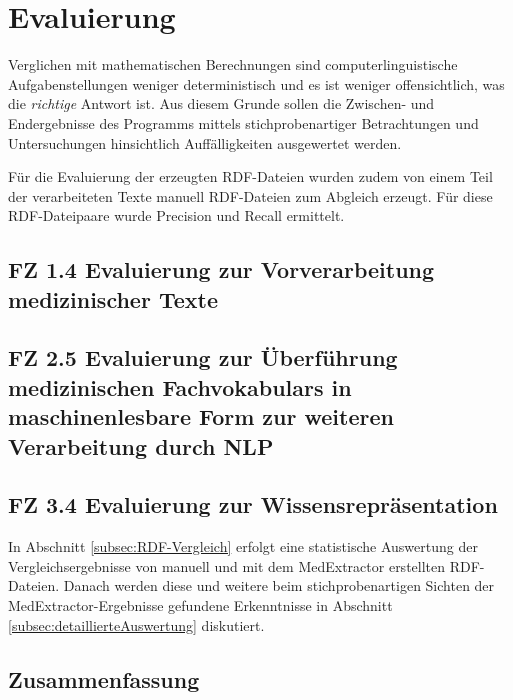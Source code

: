 \chapter{Evaluierung}
\label{ch:evaluierung}

Verglichen mit mathematischen Berechnungen sind computerlinguistische Aufgabenstellungen weniger deterministisch und es ist weniger offensichtlich, was die \emph{richtige} Antwort ist.  Aus diesem Grunde sollen die Zwischen- und Endergebnisse des Programms mittels stichprobenartiger Betrachtungen und Untersuchungen hinsichtlich Auffälligkeiten ausgewertet werden. 

Für die Evaluierung der erzeugten RDF-Dateien wurden zudem von einem Teil der verarbeiteten Texte manuell RDF-Dateien zum Abgleich erzeugt. Für diese RDF-Dateipaare wurde Precision und Recall ermittelt.


\section{FZ 1.4 Evaluierung zur Vorverarbeitung medizinischer Texte}
\label{sec:FZ1.4} 





\section[FZ 2.5 Evaluierung zur Überführung med. Fachvokabulars]{FZ 2.5 Evaluierung zur Überführung medizinischen Fachvokabulars in maschinenlesbare Form zur weiteren Verarbeitung durch NLP}
\label{sec:FZ2.5}



\section{FZ 3.4 Evaluierung zur Wissensrepräsentation}
\label{sec:FZ3.4} 
In Abschnitt \ref{subsec:RDF-Vergleich} erfolgt eine statistische Auswertung der Vergleichsergebnisse von manuell und mit dem MedExtractor erstellten RDF-Dateien. Danach werden diese und weitere beim stichprobenartigen Sichten der Med\-Extractor-Ergebnisse gefundene Erkenntnisse in Abschnitt \ref{subsec:detaillierteAuswertung} diskutiert.










\section{Zusammenfassung}
\label{sec:zusammenfassung_evaluierung} 

